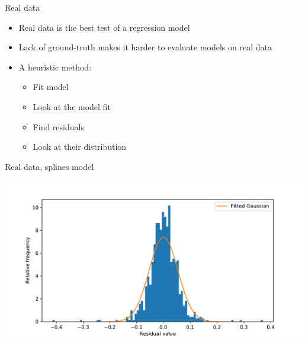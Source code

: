 \documentclass[presentation]{beamer}
\begin{document}
\begin{frame}[label={sec:org6710978}]{Real data}
\begin{itemize}
\item Real data is the best test of a regression model
\item Lack of ground-truth makes it harder to evaluate models on real data
\item A heuristic method:
\begin{itemize}
\item Fit model
\item Look at the model fit
\item Find residuals
\item Look at their distribution
\end{itemize}
\end{itemize}
\end{frame}

\begin{frame}[label={sec:org48a5efc}]{Real data, splines model}
\begin{center}
\includegraphics[width=.9\textwidth]{./hist.pdf}
\end{center}
\vfill
\end{frame}
\end{document}
